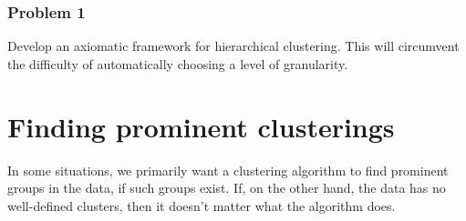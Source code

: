 \documentclass[letterpaper,10pt]{article}
\theoremstyle{definition}
\theoremstyle{plain}
\begin{document}
\subsubsection*{Problem 1}
Develop an axiomatic framework for hierarchical clustering. This will circumvent the difficulty of automatically choosing a level of granularity.

\section{Finding prominent clusterings}
In some situations, we primarily want a clustering algorithm to find prominent groups in the data, if such groups exist. If, on the other hand, the data has no well-defined clusters, then it doesn't matter what the algorithm does.
\end{document}
